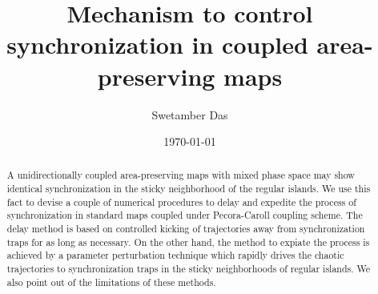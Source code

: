 \documentclass[reprint,superscriptaddress,amsmath,amssymb,aps,pre]{revtex4-1}
\begin{document}
\title{Mechanism to control synchronization in coupled area-preserving maps}

\author{Swetamber Das}

\date{\today}

\begin{abstract}
 A unidirectionally coupled area-preserving maps with mixed phase space may 
show identical synchronization in the sticky neighborhood of the regular 
islands. We use this fact to devise a couple of numerical procedures to 
delay and expedite the process of synchronization in standard maps coupled 
under  Pecora-Caroll coupling scheme. The delay method is based on controlled 
kicking of trajectories away from synchronization traps for as long as 
necessary. On the other hand, the method to expiate the process is
achieved by a parameter perturbation technique which rapidly drives the 
chaotic trajectories to synchronization traps in the sticky neighborhoods 
of regular islands. We also point out of the limitations of these methods.
\end{abstract}


\maketitle
\end{document}
